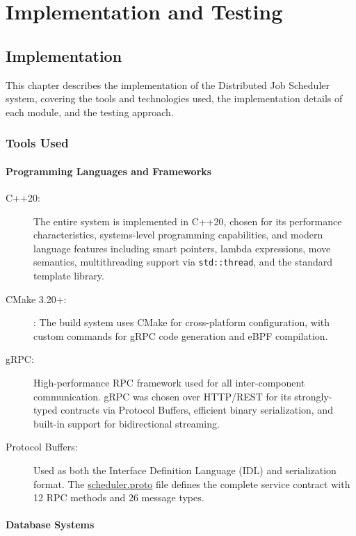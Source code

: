 \chapter{Implementation and Testing}

\section{Implementation}

This chapter describes the implementation of the Distributed Job Scheduler system, covering the tools and technologies used, the implementation details of each module, and the testing approach.

\subsection{Tools Used}

\subsubsection{Programming Languages and Frameworks}

\begin{description}
	\item[C++20:] The entire system is implemented in C++20, chosen for its performance characteristics, systems-level programming capabilities, and modern language features including smart pointers, lambda expressions, move semantics, multithreading support via \texttt{std::thread}, and the standard template library.

	\item[CMake 3.20+:]: The build system uses CMake for cross-platform configuration, with custom commands for gRPC code generation and eBPF compilation.

	\item[gRPC:] High-performance RPC framework used for all inter-component communication. gRPC was chosen over HTTP/REST for its strongly-typed contracts via Protocol Buffers, efficient binary serialization, and built-in support for bidirectional streaming.

	\item[Protocol Buffers:] Used as both the Interface Definition Language (IDL) and serialization format. The \url{scheduler.proto} file defines the complete service contract with 12 RPC methods and 26 message types.
\end{description}

\subsubsection{Database Systems}

